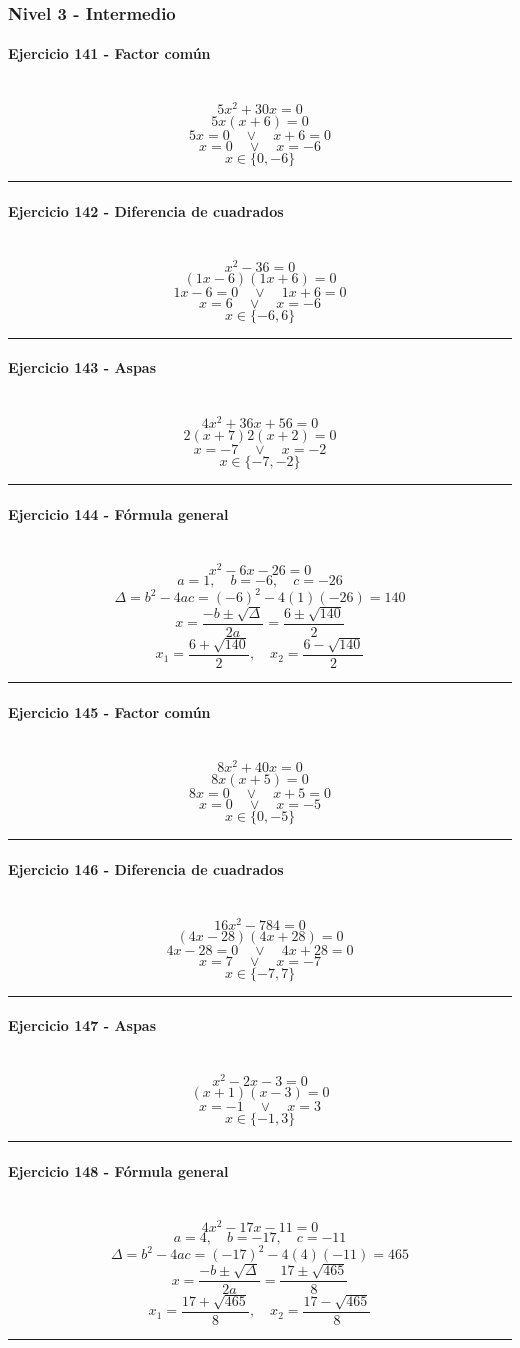 \documentclass[10pt,a4paper]{article}
\newcommand{\res}[1]{\paragraph{#1}\mbox{}\\[-1.2em]}
\begin{document}
\subsubsection*{Nivel 3 - Intermedio}
\res{Ejercicio 141 - Factor común}
\[ 5 x^{2} + 30 x=0 \]
\[ 5x(x+6)=0 \]
\[ 5x=0 \quad \vee \quad x+6=0 \]
\[ x=0 \quad \vee \quad x=-6 \]
\[ \boxed{x\in\{0,-6\}} \]
\vspace{1mm}\hrule\vspace{2mm}
\res{Ejercicio 142 - Diferencia de cuadrados}
\[ x^{2} - 36=0 \]
\[ (1x-6)(1x+6)=0 \]
\[ 1x-6=0 \quad \vee \quad 1x+6=0 \]
\[ x=6 \quad \vee \quad x=-6 \]
\[ \boxed{x\in\{-6,6\}} \]
\vspace{1mm}\hrule\vspace{2mm}
\res{Ejercicio 143 - Aspas}
\[ 4 x^{2} + 36 x + 56=0 \]
\[ 2(x+7)2(x+2)=0 \]
\[ x=-7 \quad \vee \quad x=-2 \]
\[ \boxed{x\in\{-7,-2\}} \]
\vspace{1mm}\hrule\vspace{2mm}
\res{Ejercicio 144 - Fórmula general}
\[ x^{2} - 6 x - 26=0 \]
\[ a=1,\quad b=-6,\quad c=-26 \]
\[ \Delta=b^2-4ac=(-6)^2-4(1)(-26)=140 \]
\[ x=\frac{-b\pm\sqrt{\Delta}}{2a}=\frac{6\pm\sqrt{140}}{2} \]
\[ \boxed{x_1=\frac{6+\sqrt{140}}{2},\quad x_2=\frac{6-\sqrt{140}}{2}} \]
\vspace{1mm}\hrule\vspace{2mm}
\res{Ejercicio 145 - Factor común}
\[ 8 x^{2} + 40 x=0 \]
\[ 8x(x+5)=0 \]
\[ 8x=0 \quad \vee \quad x+5=0 \]
\[ x=0 \quad \vee \quad x=-5 \]
\[ \boxed{x\in\{0,-5\}} \]
\vspace{1mm}\hrule\vspace{2mm}
\res{Ejercicio 146 - Diferencia de cuadrados}
\[ 16 x^{2} - 784=0 \]
\[ (4x-28)(4x+28)=0 \]
\[ 4x-28=0 \quad \vee \quad 4x+28=0 \]
\[ x=7 \quad \vee \quad x=-7 \]
\[ \boxed{x\in\{-7,7\}} \]
\vspace{1mm}\hrule\vspace{2mm}
\res{Ejercicio 147 - Aspas}
\[ x^{2} - 2 x - 3=0 \]
\[ (x+1)(x-3)=0 \]
\[ x=-1 \quad \vee \quad x=3 \]
\[ \boxed{x\in\{-1,3\}} \]
\vspace{1mm}\hrule\vspace{2mm}
\res{Ejercicio 148 - Fórmula general}
\[ 4 x^{2} - 17 x - 11=0 \]
\[ a=4,\quad b=-17,\quad c=-11 \]
\[ \Delta=b^2-4ac=(-17)^2-4(4)(-11)=465 \]
\[ x=\frac{-b\pm\sqrt{\Delta}}{2a}=\frac{17\pm\sqrt{465}}{8} \]
\[ \boxed{x_1=\frac{17+\sqrt{465}}{8},\quad x_2=\frac{17-\sqrt{465}}{8}} \]
\vspace{1mm}\hrule\vspace{2mm}
\end{document}
